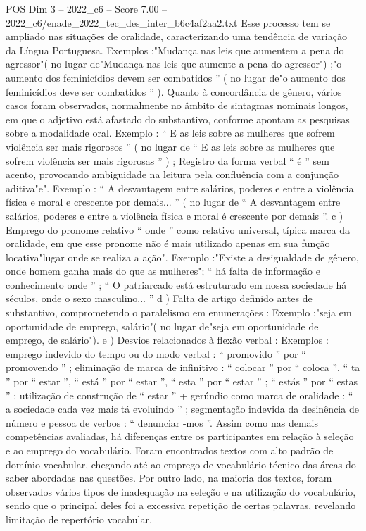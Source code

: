 \begin{textsample}{POS Dim 3 – 2022\_c6 – Score 7.00 – 2022\_c6/enade\_2022\_tec\_des\_inter\_b6c4af2aa2.txt}
Esse processo tem se ampliado nas situações de oralidade, caracterizando uma tendência de variação da Língua Portuguesa.
Exemplos :"Mudança nas leis que aumentem a pena do agressor"( no lugar de"Mudança nas leis que aumente a pena do agressor") ;"o aumento dos feminicídios devem ser combatidos ” ( no lugar de"o aumento dos feminicídios deve ser combatidos ” ).
Quanto à concordância de gênero, vários casos foram observados, normalmente no âmbito de sintagmas nominais longos, em que o adjetivo está afastado do substantivo, conforme apontam as pesquisas sobre a modalidade oral.
Exemplo : “ E as leis sobre as mulheres que sofrem violência ser mais rigorosos ” ( no lugar de “ E as leis sobre as mulheres que sofrem violência ser mais rigorosas ” ) ; Registro da forma verbal “ é ” sem acento, provocando ambiguidade na leitura pela confluência com a conjunção aditiva"e".
Exemplo : “ A desvantagem entre salários, poderes e entre a violência física e moral e crescente por demais... ” ( no lugar de “ A desvantagem entre salários, poderes e entre a violência física e moral é crescente por demais ”. c ) Emprego do pronome relativo “ onde ” como relativo universal, típica marca da oralidade, em que esse pronome não é mais utilizado apenas em sua função locativa"lugar onde se realiza a ação".
Exemplo :"Existe a desigualdade de gênero, onde homem ganha mais do que as mulheres"; “ há falta de informação e conhecimento onde ” ; “ O patriarcado está estruturado em nossa sociedade há séculos, onde o sexo masculino... ” d ) Falta de artigo definido antes de substantivo, comprometendo o paralelismo em enumerações : Exemplo :"seja em oportunidade de emprego, salário"( no lugar de"seja em oportunidade de emprego, de salário"). e ) Desvios relacionados à flexão verbal : Exemplos : emprego indevido do tempo ou do modo verbal : “ promovido ” por “ promovendo ” ; eliminação de marca de infinitivo : “ colocar ” por “ coloca ”, “ ta ” por “ estar ”, “ está ” por “ estar ”, “ esta ” por “ estar ” ; “ estás ” por “ estas ” ; utilização de construção de “ estar ” + gerúndio como marca de oralidade : “ a sociedade cada vez mais tá evoluindo ” ; segmentação indevida da desinência de número e pessoa de verbos : “ denunciar -mos ”.
Assim como nas demais competências avaliadas, há diferenças entre os participantes em relação à seleção e ao emprego do vocabulário.
Foram encontrados textos com alto padrão de domínio vocabular, chegando até ao emprego de vocabulário técnico das áreas do saber abordadas nas questões.
Por outro lado, na maioria dos textos, foram observados vários tipos de inadequação na seleção e na utilização do vocabulário, sendo que o principal deles foi a excessiva repetição de certas palavras, revelando limitação de repertório vocabular.

\end{textsample}
